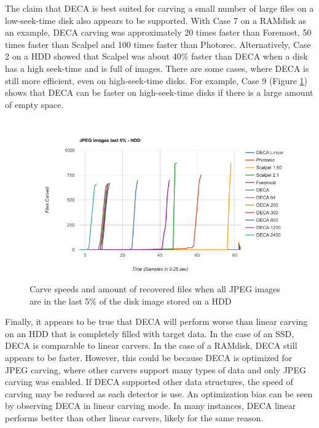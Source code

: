 \documentclass[final,5p,times,twocolumn,authoryear]{elsarticle}
\begin{document}
The claim that DECA is best suited for carving a small number of large files on a low-seek-time disk also appears to be supported. With Case 7 on a RAMdisk as an example, DECA carving was approximately 20 times faster than Foremost, 50 times faster than Scalpel and 100 times faster than Photorec. Alternatively, Case 2 on a HDD showed that Scalpel was about 40\% faster than DECA when a disk has a high seek-time and is full of images. There are some cases, where DECA is still more efficient, even on high-seek-time disks. For example, Case 9 (Figure \ref{fig:last5hdd}) shows that DECA can be faster on high-seek-time disks if there is a large amount of empty space.

\begin{figure}
	\centerline{\includegraphics[width=0.9\linewidth]{figures/last5hdd.png}}
	\caption{Carve speeds and amount of recovered files when all JPEG images are in the last 5\% of the disk image stored on a HDD}
	\label{fig:last5hdd}
\end{figure}

Finally, it appears to be true that DECA will perform worse than linear carving on an HDD that is completely filled with target data. In the case of an SSD, DECA is comparable to linear carvers. In the case of a RAMdisk, DECA still appears to be faster. However, this could be because DECA is optimized for JPEG carving, where other carvers support many types of data and only JPEG carving was enabled. If DECA supported other data structures, the speed of carving may be reduced as each detector is use. An optimization bias can be seen by observing DECA in linear carving mode. In many instances, DECA linear performs better than other linear carvers, likely for the same reason.
\end{document}
